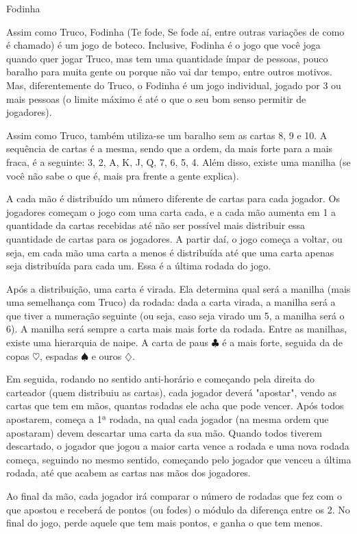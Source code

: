 \begin{subsecao}{Fodinha}

Assim como Truco, Fodinha (Te fode, Se fode aí, entre outras variações de
como é chamado) é um jogo de boteco. Inclusive, Fodinha é o jogo
que você joga quando quer jogar Truco, mas tem uma quantidade ímpar de 
pessoas, pouco baralho para muita gente ou porque não vai dar tempo, entre
outros motivos. Mas, diferentemente do Truco, o Fodinha é um jogo individual,
jogado por 3 ou mais pessoas (o limite máximo é até o que o seu bom senso
permitir de jogadores).

Assim como Truco, também utiliza-se um baralho sem as cartas 8, 9 e 10. A sequência
de cartas é a mesma, sendo que a ordem, da mais forte para a mais fraca, é a seguinte:
3, 2, A, K, J, Q, 7, 6, 5, 4. Além disso, existe uma manilha (se você não sabe o que é,
mais pra frente a gente explica).

A cada mão é distribuído um número diferente de cartas para cada jogador. Os
jogadores começam o jogo com uma carta cada, e a cada mão aumenta em 1 a
quantidade da cartas recebidas até não ser possível mais distribuir essa quantidade
de cartas para os jogadores. A partir daí, o jogo começa a voltar, ou seja, em cada
mão uma carta a menos é distribuída até que uma carta apenas seja distribuída para 
cada um. Essa é a última rodada do jogo.

Após a distribuição, uma carta é virada. Ela determina qual será a 
manilha (mais uma semelhança com Truco) da rodada: dada a carta virada, a manilha
será a que tiver a numeração seguinte (ou seja, caso seja virado um 5, a manilha
será o 6). A manilha será sempre a carta mais mais forte da rodada. Entre as
manilhas, existe uma hierarquia de naipe. A carta de paus $\clubsuit$ é a mais
forte, seguida da de copas $\heartsuit$, espadas $\spadesuit$ e ouros
$\diamondsuit$.

Em seguida, rodando no sentido anti-horário e começando pela direita do
carteador (quem distribuiu as cartas), cada jogador deverá "apostar", vendo
as cartas que tem em mãos, quantas rodadas ele acha que pode vencer. Após
todos apostarem, começa a 1ª rodada, na qual cada jogador (na mesma ordem
que apostaram) devem descartar uma carta da sua mão. Quando todos tiverem
descartado, o jogador que jogou a maior carta vence a rodada e uma nova
rodada começa, seguindo no mesmo sentido, começando pelo jogador que venceu
a última rodada, até que acabem as cartas nas mãos dos jogadores.

Ao final da mão, cada jogador irá comparar o número de rodadas que fez com
o que apostou e receberá de pontos (ou fodes) o módulo da diferença entre os
2. No final do jogo, perde aquele que tem mais pontos, e ganha o que tem menos.


\end{subsecao}
